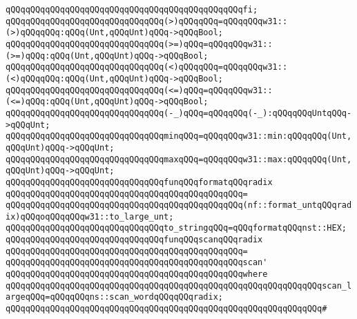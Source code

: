 \verb|qQQqqQQqqQQqqQQqqQQqqQQqqQQqqQQqqQQqqQQqqQQqqQQqfi;|\newline
\newline
\verb|qQQqqQQqqQQqqQQqqQQqqQQqqQQqqQQq(>)qQQqqQQq=qQQqqQQqw31::(>)qQQqqQQq:qQQq(Unt,qQQqUnt)qQQq->qQQqBool;|\newline
\verb|qQQqqQQqqQQqqQQqqQQqqQQqqQQqqQQq(>=)qQQq=qQQqqQQqw31::(>=)qQQq:qQQq(Unt,qQQqUnt)qQQq->qQQqBool;|\newline
\verb|qQQqqQQqqQQqqQQqqQQqqQQqqQQqqQQq(<)qQQqqQQq=qQQqqQQqw31::(<)qQQqqQQq:qQQq(Unt,qQQqUnt)qQQq->qQQqBool;|\newline
\verb|qQQqqQQqqQQqqQQqqQQqqQQqqQQqqQQq(<=)qQQq=qQQqqQQqw31::(<=)qQQq:qQQq(Unt,qQQqUnt)qQQq->qQQqBool;|\newline
\newline
\verb|qQQqqQQqqQQqqQQqqQQqqQQqqQQqqQQq(-_)qQQq=qQQqqQQq(-_):qQQqqQQqUntqQQq->qQQqUnt;|\newline
\newline
\verb|qQQqqQQqqQQqqQQqqQQqqQQqqQQqqQQqminqQQq=qQQqqQQqw31::min:qQQqqQQq(Unt,qQQqUnt)qQQq->qQQqUnt;|\newline
\verb|qQQqqQQqqQQqqQQqqQQqqQQqqQQqqQQqmaxqQQq=qQQqqQQqw31::max:qQQqqQQq(Unt,qQQqUnt)qQQq->qQQqUnt;|\newline
\newline
\verb|qQQqqQQqqQQqqQQqqQQqqQQqqQQqqQQqfunqQQqformatqQQqradix|\newline
\verb|qQQqqQQqqQQqqQQqqQQqqQQqqQQqqQQqqQQqqQQqqQQqqQQq=|\newline
\verb|qQQqqQQqqQQqqQQqqQQqqQQqqQQqqQQqqQQqqQQqqQQqqQQq(nf::format_untqQQqradix)qQQqoqQQqqQQqw31::to_large_unt;|\newline
\newline
\verb|qQQqqQQqqQQqqQQqqQQqqQQqqQQqqQQqto_stringqQQq=qQQqformatqQQqnst::HEX;|\newline
\newline
\verb|qQQqqQQqqQQqqQQqqQQqqQQqqQQqqQQqfunqQQqscanqQQqradix|\newline
\verb|qQQqqQQqqQQqqQQqqQQqqQQqqQQqqQQqqQQqqQQqqQQqqQQq=|\newline
\verb|qQQqqQQqqQQqqQQqqQQqqQQqqQQqqQQqqQQqqQQqqQQqqQQqscan'|\newline
\verb|qQQqqQQqqQQqqQQqqQQqqQQqqQQqqQQqqQQqqQQqqQQqqQQqwhere|\newline
\verb|qQQqqQQqqQQqqQQqqQQqqQQqqQQqqQQqqQQqqQQqqQQqqQQqqQQqqQQqqQQqqQQqscan_largeqQQq=qQQqqQQqns::scan_wordqQQqqQQqradix;|\newline
\verb|qQQqqQQqqQQqqQQqqQQqqQQqqQQqqQQqqQQqqQQqqQQqqQQqqQQqqQQqqQQqqQQq#|\newline
